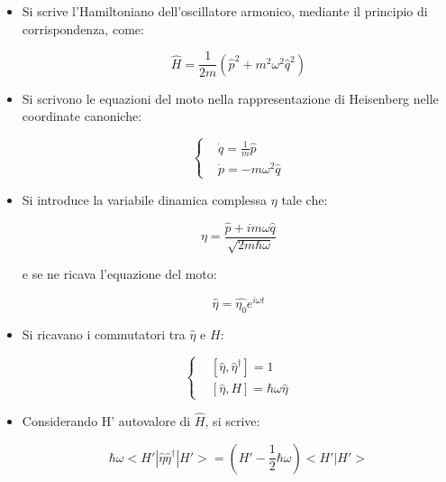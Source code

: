 \documentclass{article}
\begin{document}
\begin{itemize}
    \item Si scrive l'Hamiltoniano dell'oscillatore armonico, mediante il principio di corrispondenza, come:
    
    \begin{equation}
        \hat{H}=\frac{1}{2m}(\hat{p}^2+m^2\omega^2\hat{q}^2)
    \end{equation}
    \item Si scrivono le equazioni del moto nella rappresentazione di Heisenberg nelle coordinate canoniche:
    
    \begin{equation}
        \left\{
        \begin{aligned}
            & \dot{q}=\frac{1}{m}\hat{p} \\
            & \dot{p}=-m\omega^2\hat{q}
        \end{aligned}
        \right.
    \end{equation}

    \item Si introduce la variabile dinamica complessa $\eta$ tale che:
    
    \begin{equation}
    \eta= \frac{\hat{p}+im\omega \hat{q}}{\sqrt{2m\hbar \omega}}
    \end{equation}

    e se ne ricava l'equazione del moto:

    \begin{equation}
     \hat{\eta}=\hat{\eta_0} e^{i\omega t}
    \end{equation}

    \item Si ricavano i commutatori tra $\hat{\eta}$ e $H$:
    
    \begin{equation}
        \left\{
        \begin{aligned}
            & [\hat{\eta},\hat{\eta}^{\dagger}]=1 \\
            & [\hat{\eta},H]=\hbar \omega \hat{\eta}
        \end{aligned}
        \right.
    \end{equation}

    \item Considerando H' autovalore di $\hat{H}$, si scrive:
    
    \begin{equation}
        \hbar \omega<H' |\hat{\eta}\hat{\eta}^{\dagger}|H'>=(H'-\frac{1}{2}\hbar \omega)<H' |H'>
    \end{equation}


\end{itemize}
\end{document}
